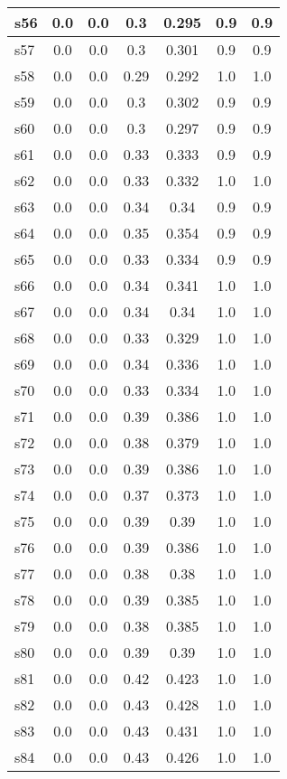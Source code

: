\documentclass{article}
\begin{document}
\begin{tabular}{|l|c|c|c|c|c|c|}
\hline
s56 &0.0 & 0.0 & 0.3 & 0.295 & 0.9 & 0.9\\
\hline
s57 &0.0 & 0.0 & 0.3 & 0.301 & 0.9 & 0.9\\
\hline
s58 &0.0 & 0.0 & 0.29 & 0.292 & 1.0 & 1.0\\
\hline
s59 &0.0 & 0.0 & 0.3 & 0.302 & 0.9 & 0.9\\
\hline
s60 &0.0 & 0.0 & 0.3 & 0.297 & 0.9 & 0.9\\
\hline
s61 &0.0 & 0.0 & 0.33 & 0.333 & 0.9 & 0.9\\
\hline
s62 &0.0 & 0.0 & 0.33 & 0.332 & 1.0 & 1.0\\
\hline
s63 &0.0 & 0.0 & 0.34 & 0.34 & 0.9 & 0.9\\
\hline
s64 &0.0 & 0.0 & 0.35 & 0.354 & 0.9 & 0.9\\
\hline
s65 &0.0 & 0.0 & 0.33 & 0.334 & 0.9 & 0.9\\
\hline
s66 &0.0 & 0.0 & 0.34 & 0.341 & 1.0 & 1.0\\
\hline
s67 &0.0 & 0.0 & 0.34 & 0.34 & 1.0 & 1.0\\
\hline
s68 &0.0 & 0.0 & 0.33 & 0.329 & 1.0 & 1.0\\
\hline
s69 &0.0 & 0.0 & 0.34 & 0.336 & 1.0 & 1.0\\
\hline
s70 &0.0 & 0.0 & 0.33 & 0.334 & 1.0 & 1.0\\
\hline
s71 &0.0 & 0.0 & 0.39 & 0.386 & 1.0 & 1.0\\
\hline
s72 &0.0 & 0.0 & 0.38 & 0.379 & 1.0 & 1.0\\
\hline
s73 &0.0 & 0.0 & 0.39 & 0.386 & 1.0 & 1.0\\
\hline
s74 &0.0 & 0.0 & 0.37 & 0.373 & 1.0 & 1.0\\
\hline
s75 &0.0 & 0.0 & 0.39 & 0.39 & 1.0 & 1.0\\
\hline
s76 &0.0 & 0.0 & 0.39 & 0.386 & 1.0 & 1.0\\
\hline
s77 &0.0 & 0.0 & 0.38 & 0.38 & 1.0 & 1.0\\
\hline
s78 &0.0 & 0.0 & 0.39 & 0.385 & 1.0 & 1.0\\
\hline
s79 &0.0 & 0.0 & 0.38 & 0.385 & 1.0 & 1.0\\
\hline
s80 &0.0 & 0.0 & 0.39 & 0.39 & 1.0 & 1.0\\
\hline
s81 &0.0 & 0.0 & 0.42 & 0.423 & 1.0 & 1.0\\
\hline
s82 &0.0 & 0.0 & 0.43 & 0.428 & 1.0 & 1.0\\
\hline
s83 &0.0 & 0.0 & 0.43 & 0.431 & 1.0 & 1.0\\
\hline
s84 &0.0 & 0.0 & 0.43 & 0.426 & 1.0 & 1.0\\

\end{tabular}
\end{document}
